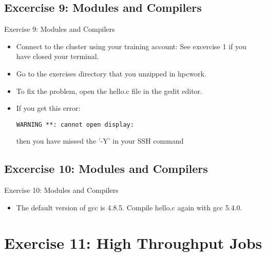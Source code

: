 \documentclass[handout]{beamer} %
\begin{document}
\subsection{Excercise 9: Modules and Compilers}
\begin{frame}[fragile]{Exercise 9: Modules and Compilers}
\begin{itemize}
\item{Connect to the cluster using your training account: See excercise 1 if you have closed your terminal.}
\item{Go to the \alert{exercises} directory that you unzipped in hpcwork.}
\item{To fix the problem, open the \alert{hello.c} file in the \alert{gedit} editor.}
\item{If you get this error: \begin{verbatim}WARNING **: cannot open display:\end{verbatim} then you have missed the '-Y' in your SSH command}
\end{itemize}
\end{frame}
 
\subsection{Excercise 10: Modules and Compilers}
\begin{frame}[fragile]{Exercise 10: Modules and Compilers}
\begin{itemize} 
\item{The default version of gcc is 4.8.5. Compile hello.c again with \alert{gcc 5.4.0}.}
\end{itemize}
\end{frame}

\section{Exercise 11: High Throughput Jobs}
\end{document}
